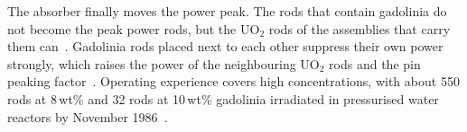 The absorber finally moves the power peak. The rods that contain
gadolinia do not become the peak power rods, but the UO$_2$ rods of the
assemblies that carry them can~\cite{robinson_gd10}. Gadolinia rods
placed next to each other suppress their own power strongly, which
raises the power of the neighbouring UO$_2$ rods and the pin peaking
factor~\cite{radaideh_2021_rl}. Operating experience covers high
concentrations, with about 550 rods at 8\,wt\% and 32 rods at 10\,wt\%
gadolinia irradiated in pressurised water reactors by November
1986~\cite{robinson_gd10}.
